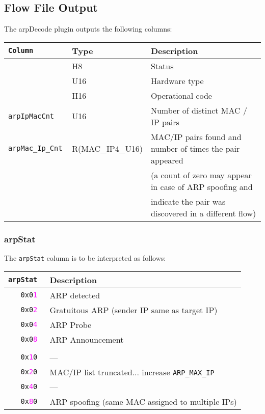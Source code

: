 \documentclass[documentation]{subfiles}
\begin{document}
\subsection{Flow File Output}
The arpDecode plugin outputs the following columns:
\begin{longtable}{>{\tt}lll}
    \toprule
    {\bf Column}        & {\bf Type}       & {\bf Description}\\
    \midrule\endhead%
    \nameref{arpStat}   & H8               & Status\\
    \nameref{arpHwType} & U16              & Hardware type\\
    \nameref{arpOpcode} & H16              & Operational code\\
    arpIpMacCnt         & U16              & Number of distinct MAC / IP pairs\\
    arpMac\_Ip\_Cnt     & R(MAC\_IP4\_U16) & MAC/IP pairs found and number of times the pair appeared\\
                        &                  & (a count of zero may appear in case of ARP spoofing and \\
                        &                  & indicate the pair was discovered in a different flow)\\
    \bottomrule
\end{longtable}

\subsubsection{arpStat}\label{arpStat}
The {\tt arpStat} column is to be interpreted as follows:
\begin{longtable}{>{\tt}rl}
    \toprule
    {\bf arpStat} & {\bf Description}\\
    \midrule\endhead%
    0x0\textcolor{magenta}{1} & ARP detected\\
    0x0\textcolor{magenta}{2} & Gratuitous ARP (sender IP same as target IP)\\
    0x0\textcolor{magenta}{4} & ARP Probe\\
    0x0\textcolor{magenta}{8} & ARP Announcement\\
    \\
    0x\textcolor{magenta}{1}0 & ---\\
    0x\textcolor{magenta}{2}0 & MAC/IP list truncated... increase {\tt ARP\_MAX\_IP}\\
    0x\textcolor{magenta}{4}0 & ---\\ %
    0x\textcolor{magenta}{8}0 & ARP spoofing (same MAC assigned to multiple IPs)\\
    \bottomrule
\end{longtable}
\end{document}
